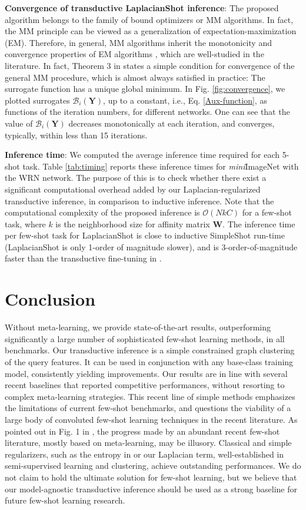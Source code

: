 \documentclass{article}
\newcommand{\Bcal}{\mathcal{B}}
\newcommand{\YY}{\mathbf Y}
\newcommand{\WW}{\mathbf W}
\begin{document}
\textbf{Convergence of transductive LaplacianShot inference}:
The proposed algorithm belongs to the family of bound optimizers or MM algorithms. 
In fact, the MM principle can be viewed as a generalization of expectation-maximization (EM). Therefore, in general, MM algorithms inherit the monotonicity and convergence properties of EM algorithms \cite{vaida2005parameter}, which are well-studied in the literature. In fact, Theorem 3 in \cite{vaida2005parameter} states a simple condition for convergence of the general MM procedure, which is almost always satisfied in practice: The surrogate function has a unique global minimum. In Fig. \ref{fig:convergence}, we plotted surrogates $\Bcal_i(\YY)$, up to a constant, i.e., Eq. \eqref{Aux-function}, as functions of the iteration numbers, for different networks. One can see that the value of $\Bcal_i(\YY)$ decreases monotonically at each iteration, and converges, typically, within less than 15 iterations.

\textbf{Inference time}: We computed the average inference time required for each 5-shot task. Table \ref{tab:timing} reports these inference times for \textit{mini}ImageNet with the WRN network. The purpose of this is to check whether there exist a significant computational overhead added by our Laplacian-regularized transductive inference, in comparison to inductive inference. Note that the computational complexity of the proposed inference is $\mathcal{O}(NkC)$ for a few-shot task, where $k$ is the neighborhood size for affinity matrix $\WW$. The inference time per few-shot task for LaplacianShot is close to inductive SimpleShot run-time (LaplacianShot is only 1-order of magnitude slower), and is 3-order-of-magnitude faster than the transductive fine-tuning in \cite{Dhillon2020A}. 

\section{Conclusion}
Without meta-learning, we provide state-of-the-art results, outperforming significantly a large number of sophisticated few-shot learning methods, in all benchmarks. Our transductive inference is a simple constrained graph clustering of the query features. It can be used in conjunction with any base-class training model, consistently yielding improvements. Our results are in line with several recent baselines \cite{Dhillon2020A,chen2018a,wang2019simpleshot} that reported competitive performances, without resorting to complex meta-learning strategies. This recent line of simple methods emphasizes the limitations of current few-shot benchmarks, and questions the viability of a large body of convoluted few-shot learning techniques in the recent literature. As pointed out in Fig. 1 in \cite{Dhillon2020A}, the progress made by an abundant recent few-shot literature, mostly based on meta-learning, may be illusory. Classical and simple regularizers, such as the entropy in \cite{Dhillon2020A} or our Laplacian term, well-established in semi-supervised learning and clustering, achieve outstanding performances. We do not claim to hold the ultimate solution for few-shot learning, but we believe that our model-agnostic transductive inference should be used as a strong baseline for future few-shot learning research.



\end{document}
